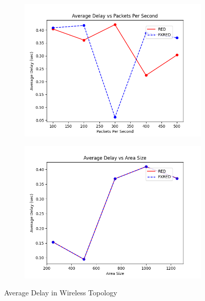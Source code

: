 \documentclass[10pt]{report}
\begin{document}
\begin{figure}
\begin{subfigure}{.5\textwidth}
    \end{subfigure}
    \begin{subfigure}{.5\textwidth}
        \includegraphics[width=1\linewidth]{static/graphs/wireless/Average Delay vs Packets Per Second.png}
    \end{subfigure}%
    \begin{subfigure}{.5\textwidth}
        \includegraphics[width=1\linewidth]{static/graphs/wireless/Average Delay vs Area Size.png}
    \end{subfigure}
    \caption{Average Delay in Wireless Topology}
    \label{fig:wireless_avg_delay}
\end{figure}
\end{document}
